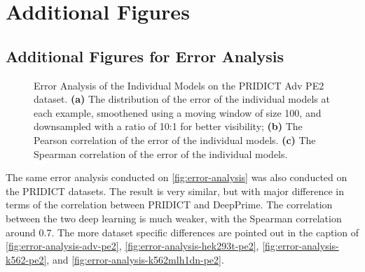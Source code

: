 \chapter{Additional Figures}
\label{appendix:additional-figures}

\section{Additional Figures for Error Analysis}
\label{appendix:error-analysis-figures}



\begin{figure}[ht]
    \centering
    \caption[Error Analysis of the Individual Models on PRIDICT Adv PE2 dataset]{Error Analysis of the Individual Models on the PRIDICT Adv PE2 dataset. \textbf{(a)} The distribution of the error of the individual models at each example, smoothened using a moving window of size 100, and downsampled with a ratio of 10:1 for better visibility; \textbf{(b)} The Pearson correlation of the error of the individual models. \textbf{(c)} The Spearman correlation of the error of the individual models.}
    \label{fig:error-analysis-adv-pe2}
\end{figure}

The same error analysis conducted on \autoref{fig:error-analysis} was also conducted on the PRIDICT datasets. The result is very similar, but with major difference in terms of the correlation between PRIDICT and DeepPrime. The correlation between the two deep learning is much weaker, with the Spearman correlation around 0.7. The more dataset specific differences are pointed out in the caption of \autoref{fig:error-analysis-adv-pe2}, \autoref{fig:error-analysis-hek293t-pe2}, \autoref{fig:error-analysis-k562-pe2}, and \autoref{fig:error-analysis-k562mlh1dn-pe2}.

